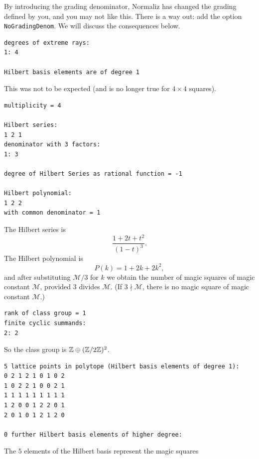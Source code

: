 By introducing the grading denominator, Normaliz has changed the grading defined by you,
and you may not like this. There is a way out: add the option \verb|NoGradingDenom|. We will discuss the consequences below.
\begin{Verbatim}
degrees of extreme rays:
1: 4  

Hilbert basis elements are of degree 1
\end{Verbatim}
This was not to be expected (and is no longer true for $4\times 4$ squares).
\begin{Verbatim}
multiplicity = 4

Hilbert series:
1 2 1 
denominator with 3 factors:
1: 3  

degree of Hilbert Series as rational function = -1

Hilbert polynomial:
1 2 2 
with common denominator = 1
\end{Verbatim}
The Hilbert series is
$$
\frac{1+2t+t^2}{(1-t)^3}.
$$
The Hilbert polynomial is
$$
P(k)=1+2k+2k^2,
$$
and after substituting $\mathcal M/3$ for $k$ we obtain the
number of magic squares of magic constant $\mathcal M$, provided $3$ divides $\mathcal M$. (If $3\nmid \mathcal M$, there is no magic square of magic constant $\mathcal M$.)
\begin{Verbatim}
rank of class group = 1
finite cyclic summands:
2: 2  
\end{Verbatim}
So the class group is ${\mathbb Z}\oplus ({\mathbb Z}/2{\mathbb Z})^2$.
\begin{Verbatim}
5 lattice points in polytope (Hilbert basis elements of degree 1):
0 2 1 2 1 0 1 0 2
1 0 2 2 1 0 0 2 1
1 1 1 1 1 1 1 1 1
1 2 0 0 1 2 2 0 1
2 0 1 0 1 2 1 2 0

0 further Hilbert basis elements of higher degree:
\end{Verbatim}
The $5$ elements of the Hilbert basis represent the magic
squares
